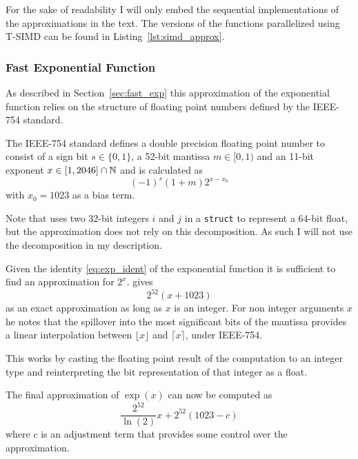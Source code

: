 \documentclass[a4paper, 11pt]{memoir}
\begin{document}
    For the sake of readability I will only embed the sequential implementations of the approximations in the text. The
    versions of the functions parallelized using T-SIMD can be found in Listing~\ref{lst:simd_approx}.

    \subsubsection{Fast Exponential Function}
    \label{sec:impl_fast_exp}
    As described in Section~\ref{sec:fast_exp} this approximation of the exponential function relies on the structure of
    floating point numbers defined by the IEEE-754 standard.

    The IEEE-754 standard defines a double precision floating point number to consist of a sign bit $s \in \{ 0, 1 \}$,
    a 52-bit mantissa $m \in [0, 1)$ and an 11-bit exponent $x \in [1, 2046] \cap \mathbb{N}$ and is calculated as
    \begin{equation}
        (-1)^s (1 + m) 2^{x - x_0}
        \label{eq:def_ieee754}
    \end{equation}
    with $x_0 = 1023$ as a bias term.

    Note that \citeauthor{fast_exp} uses two 32-bit integers $i$ and $j$ in a \texttt{struct} to represent a
    64-bit float, but the approximation does not rely on this decomposition. As such I will not use the decomposition
    in my description.

    Given the identity \eqref{eq:exp_ident} of the exponential function it is sufficient to find an approximation for
    $2^x$. \citeauthor{fast_exp} gives
    \begin{equation}
        2^{52}(x + 1023)
    \end{equation}
    as an exact approximation as long as $x$ is an integer. For non integer arguments $x$ he notes that the spillover into
    the most significant bits of the mantissa provides a linear interpolation between $\lfloor x \rfloor$ and $\lceil x
    \rceil$, under IEEE-754.

    This works by casting the floating point result of the computation to an integer type and reinterpreting the bit
    representation of that integer as a float.

    The final approximation of $\exp{(x)}$ can now be computed as
    \begin{equation}
        \frac{2^{52}}{\ln{(2)}} x + 2^{52}(1023 - c)
    \end{equation}
    where $c$ is an adjustment term that provides some control over the approximation.
\end{document}
